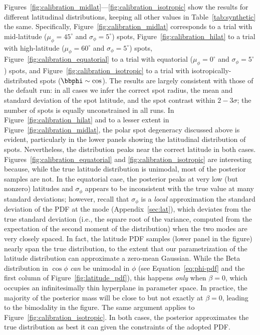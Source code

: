 \documentclass[modern]{aastex62}
\begin{document}
Figures~\ref{fig:calibration_midlat}---\ref{fig:calibration_isotropic}
show the results for different latitudinal
distributions, keeping all other values in Table~\ref{tab:synthetic} the same.
Specifically, Figure~\ref{fig:calibration_midlat} corresponds to a trial
with mid-latitude ($\mu_\phi = 45^\circ$ and $\sigma_\phi = 5^\circ$) spots,
Figure~\ref{fig:calibration_hilat} to a trial with high-latitude
($\mu_\phi = 60^\circ$ and $\sigma_\phi = 5^\circ$) spots,
Figure~\ref{fig:calibration_equatorial} to a trial with equatorial
($\mu_\phi = 0^\circ$ and $\sigma_\phi = 5^\circ$) spots, and
Figure~\ref{fig:calibration_isotropic} to a trial with isotropically-distributed
spots ($\bbphi \sim \cos$).
The results are largely consistent with those of the default run: in all
cases we infer the correct spot radius, the mean and standard deviation of
the spot latitude, and the spot contrast within $2-3\sigma$; the number of
spots is equally unconstrained in all runs.
In Figure~\ref{fig:calibration_hilat} and to a lesser extent in
Figure~\ref{fig:calibration_midlat}, the polar spot degeneracy discussed
above is evident, particularly in the lower panels showing the latitudinal
distribution of spots. Nevertheless, the distribution peaks near the correct
latitude in both cases.
Figures~\ref{fig:calibration_equatorial} and \ref{fig:calibration_isotropic}
are interesting because, while the true latitude distribution is unimodal,
most of the posterior samples are not. In the equatorial case, the posterior
peaks at very low (but nonzero) latitudes and $\sigma_\phi$ appears to be
inconsistent with the true value at many standard deviations; however, recall
that $\sigma_\phi$ is a \emph{local} approximation the standard deviation of the
PDF at the mode (Appendix~\ref{sec:lat}), which deviates from the true
standard deviation (i.e., the
square root of the variance, computed from the expectation of the second
moment of the distribution) when the two modes are very closely spaced.
In fact, the latitude PDF samples (lower panel in the figure) nearly span
the true distribution, to the extent that our parametrization of the
latitude distribution can approximate a zero-mean Gaussian. While the Beta
distribution in $\cos\phi$ \emph{can} be unimodal in $\phi$ (see
Equation~\ref{eq:phi-pdf} and the first
column of Figure~\ref{fig:latitude_pdf}), this happens \emph{only} when
$\beta = 0$, which occupies an infinitesimally thin hyperplane in
parameter space. In practice, the majority of the posterior mass will be close
to but not exactly at $\beta = 0$, leading to the bimodality in the figure.
The same argument applies to Figure~\ref{fig:calibration_isotropic}.
In both cases, the posterior approximates the true distribution as best it
can given the constraints of the adopted PDF.
\end{document}
